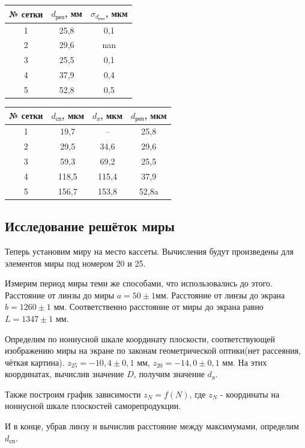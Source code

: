 \documentclass[a4paper,12pt]{article}
\begin{document}
\begin{table}[H]
\centering
\begin{tabular}{|c|c|c|}
\hline
 № сетки & $d_\text{реп}$, мм & $\sigma_{d_\text{реп}}$, мкм \\ \hline
 1 & 25,8 & 0,1 \\ \hline
 2 & 29,6 & nan \\ \hline
 3 & 25,5 & 0,1 \\ \hline
 4 & 37,9 & 0,4 \\ \hline
 5 & 52,8 & 0,5 \\ \hline
\end{tabular}
\end{table}
\begin{table}[H]
\centering
	\begin{tabular}{|c|c|c|c|}
	\hline
	№ сетки & $d_\text{сп}$, мкм & $d_\text{л}$, мкм & $d_\text{реп}$, мкм\\ \hline
	1 & 19,7 & -- & 25,8\\ \hline
	2 & 29,5 & 34,6 & 29,6\\ \hline
	3 & 59,3 & 69,2 &  25,5\\ \hline
	4 & 118,5 & 115,4 & 37,9 \\ \hline
	5 & 156,7 & 153,8 & 52,8a\\ \hline
	
	\end{tabular}
\end{table}
\subsection*{Исследование решёток миры}
Теперь установим миру на место кассеты. Вычисления будут произведены для элементов миры под номером 20 и 25. 

Измерим период миры теми же способами, что использовались до этого. Расстояние от линзы до миры $a = 50 \pm 1 $мм. Расстояние от линзы до экрана $b = 1260 \pm 1$ мм. Соответственно расстояние от миры до экрана равно $L = 1347 \pm 1$ мм.

Определим по нониусной шкале координату плоскости, соответствующей изображению миры на экране по законам геометрической оптики(нет рассеяния, чёткая картина). $z_{25} = -10,4 \pm 0,1$ мм, $z_{20} = -14,0 \pm 0,1$ мм. На этих координатах, вычислив значение $D$, получим значение $d_\text{л}$.

Также построим график зависимости $z_N = f(N)$, где $z_N$ - координаты на нониусной шкале плоскостей саморепродукции.

И в конце, убрав линзу и вычислив расстояние между максимумами, определим $d_\text{сп}$.
\end{document}
